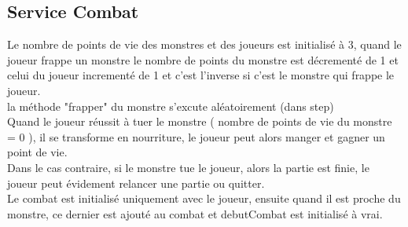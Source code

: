 \documentclass{article}
\begin{document}
\subsection{Service Combat}
Le nombre de points de vie des monstres et des joueurs est initialisé à 3, quand le joueur frappe un monstre le nombre de points du monstre est décrementé de 1 et celui du joueur incrementé de 1 et c'est l'inverse si c'est le monstre qui frappe le joueur.
\\
la méthode "frapper" du monstre s'excute aléatoirement (dans step)
\\ 
Quand le joueur réussit à tuer le monstre ( nombre de points de vie du monstre = 0 ), il se transforme en nourriture, le joueur peut alors manger et gagner un point de vie.
\\
Dans le cas contraire, si le monstre tue le joueur, alors la partie est finie, le joueur peut évidement relancer une partie ou quitter.
\\
Le combat est initialisé uniquement avec le joueur, ensuite quand il est proche du monstre, ce dernier est ajouté au combat et debutCombat est initialisé à vrai.
\newpage
\end{document}
